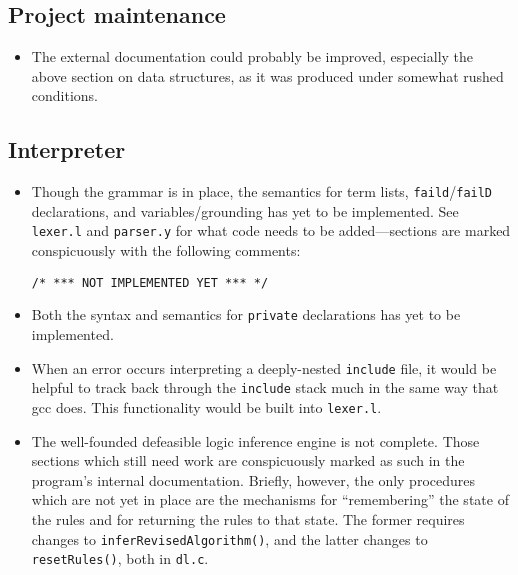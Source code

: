 \documentclass[a4paper,10pt,twocolumn]{article}
\begin{document}
\subsection{Project maintenance}

\begin{itemize}
  
\item The external documentation could probably be improved,
  especially the above section on data structures, as it was produced
  under somewhat rushed conditions.

\end{itemize}

\subsection{Interpreter}

\begin{itemize}
  
\item Though the grammar is in place, the semantics for term lists,
  \texttt{faild}/\texttt{failD} declarations, and variables/grounding has yet to be
  implemented. See \texttt{lexer.l} and \texttt{parser.y} for what
  code needs to be added---sections are marked conspicuously with the
  following comments:
\begin{verbatim}
/* *** NOT IMPLEMENTED YET *** */
\end{verbatim}  
  
\item Both the syntax and semantics for \texttt{private} declarations
  has yet to be implemented.
  
\item When an error occurs interpreting a deeply-nested
  \texttt{include} file, it would be helpful to track back through the
  \texttt{include} stack much in the same way that gcc does. This
  functionality would be built into \texttt{lexer.l}.
       
\item The well-founded defeasible logic inference engine is not
  complete. Those sections which still need work are conspicuously
  marked as such in the program's internal documentation. Briefly,
  however, the only procedures which are not yet in place are the
  mechanisms for ``remembering'' the state of the rules and for
  returning the rules to that state. The former requires changes to
  \texttt{inferRevisedAlgorithm()}, and the latter changes to
  \texttt{resetRules()}, both in \texttt{dl.c}.

\end{itemize}
\end{document}
